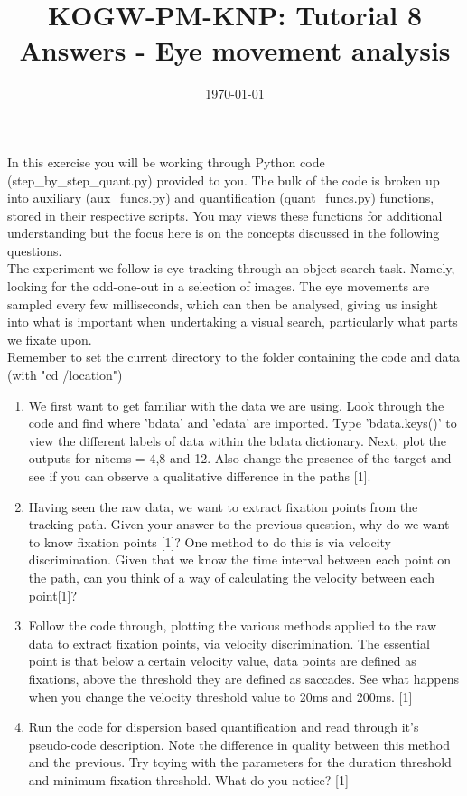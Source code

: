 \documentclass[12pt,english]{scrartcl}
\title{KOGW-PM-KNP: Tutorial 8 Answers - Eye movement analysis}
\author{}
\date{\today}
\begin{document}
	
\maketitle
In this exercise you will be working through Python code (step\_by\_step\_quant.py) provided to you. The bulk of the code is broken up into auxiliary (aux\_funcs.py) and quantification (quant\_funcs.py) functions, stored in their respective scripts. You may views these functions for additional understanding but the focus here is on the concepts discussed in the following questions. \\

The experiment we follow is eye-tracking through an object search task. Namely, looking for the odd-one-out in a selection of images. The eye movements are sampled every few milliseconds, which can then be analysed, giving us insight into what is important when undertaking a visual search, particularly what parts we fixate upon. \\

Remember to set the current directory to the folder containing the code and data (with "cd /location") \\


\begin{enumerate}
\item We first want to get familiar with the data we are using. Look through the code and find where 'bdata' and 'edata' are imported. Type 'bdata.keys()' to view the different labels of data within the bdata dictionary. Next, plot the outputs for nitems = 4,8 and 12. Also change the presence of the target and see if you can observe a qualitative difference in the paths [1]. \\

 
 \color{black}
 \item Having seen the raw data, we want to extract fixation points from the tracking path. Given your answer to the previous question, why do we want to know fixation points [1]? One method to do this is via velocity discrimination. Given that we know the time interval between each point on the path, can you think of a way of calculating the velocity between each point[1]? \\
 

 \color{black}
 \item Follow the code through, plotting the various methods applied to the raw data to extract fixation points, via velocity discrimination. The essential point is that below a certain velocity value, data points are defined as fixations, above the threshold they are defined as saccades. See what happens when you change the velocity threshold value to 20ms and 200ms. [1] \\
 

 \color{black}
 \item Run the code for dispersion based quantification and read through it's pseudo-code description. Note the difference in quality between this method and the previous. Try toying with the parameters for the duration threshold and minimum fixation threshold. What do you notice? [1]\\

 \end{enumerate}
\end{document}
